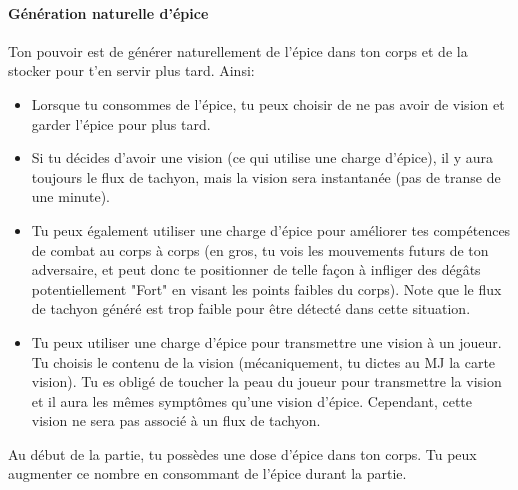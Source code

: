 {	\paragraph{Génération naturelle d'épice} Ton pouvoir est de générer naturellement de l'épice dans ton corps et de la stocker pour t'en servir plus tard. Ainsi:
	\begin{itemize}
		\item Lorsque tu consommes de l'épice, tu peux choisir de ne pas avoir de vision et garder l'épice pour plus tard.
		\item Si tu décides d'avoir une vision (ce qui utilise une charge d'épice), il y aura toujours le flux de tachyon, mais la vision sera instantanée (pas de transe de une minute).
		\item Tu peux également utiliser une charge d'épice pour améliorer tes compétences de combat au corps à corps (en gros, tu vois les mouvements futurs de ton adversaire, et peut donc te positionner de telle façon à infliger des dégâts potentiellement "Fort" en visant les points faibles du corps). Note que le flux de tachyon généré est trop faible pour être détecté dans cette situation.
		\item Tu peux utiliser une charge d'épice pour transmettre une vision à un joueur. Tu choisis le contenu de la vision (mécaniquement, tu dictes au MJ la carte vision). Tu es obligé de toucher la peau du joueur pour transmettre la vision et il aura les mêmes symptômes qu'une vision d'épice. Cependant, cette vision ne sera pas associé à un flux de tachyon.
	\end{itemize}
	Au début de la partie, tu possèdes une dose d'épice dans ton corps. Tu peux augmenter ce nombre en consommant de l'épice durant la partie.
}



